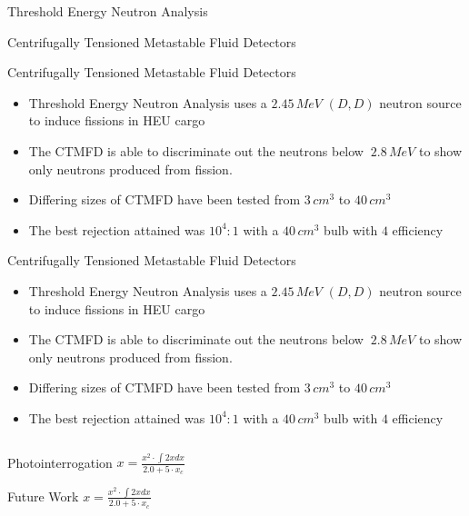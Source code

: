 \begin{column}
\begin{cell}{Threshold Energy Neutron Analysis}
\begin{subcell}{Centrifugally Tensioned Metastable Fluid Detectors}
\begin{itemize}
            \end{itemize}
        \end{subcell}
        \begin{subcell}{Centrifugally Tensioned Metastable Fluid Detectors}
            \begin{itemize}
                \item Threshold Energy Neutron Analysis uses a $2.45\,MeV$ $\left( D,D\right)$ neutron source to induce fissions in HEU cargo
                \item The CTMFD is able to discriminate out the neutrons below $~2.8\,MeV$ to show only neutrons produced from fission.
                \item Differing sizes of CTMFD have been tested from $3\,cm^{3}$ to $40\,cm^{3}$
                \item The best rejection attained was $10^{4}:1$ with a $40\,cm^{3}$ bulb with $4$ efficiency
            \end{itemize}
        \end{subcell}
        \begin{subcell}{Centrifugally Tensioned Metastable Fluid Detectors}
            \begin{itemize}
                \item Threshold Energy Neutron Analysis uses a $2.45\,MeV$ $\left( D,D\right)$ neutron source to induce fissions in HEU cargo
                \item The CTMFD is able to discriminate out the neutrons below $~2.8\,MeV$ to show only neutrons produced from fission.
                \item Differing sizes of CTMFD have been tested from $3\,cm^{3}$ to $40\,cm^{3}$
                \item The best rejection attained was $10^{4}:1$ with a $40\,cm^{3}$ bulb with $4$ efficiency
            \end{itemize}
        \end{subcell}
    \end{cell}

\end{column}

\begin{column}

    \begin{cell}{Photointerrogation}
        \lipsum[1]
        $ x = \frac{x^{2} \cdot \int 2 x dx}{2.0 + 5\cdot x_{c}} $
    \end{cell}

    \begin{cell}{Future Work}
        \lipsum[1]
        $ x = \frac{x^{2} \cdot \int 2 x dx}{2.0 + 5\cdot x_{c}} $
    \end{cell}

\end{column}


